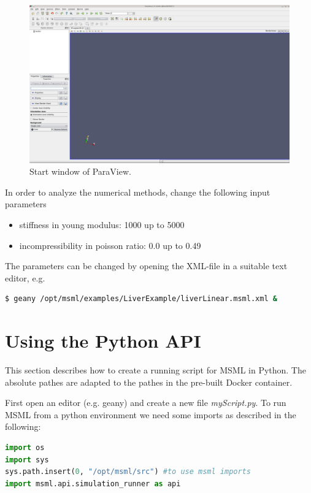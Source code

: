 \begin{figure}[h]
  	\centering
    \includegraphics[width=\textwidth]{pictures/start_paraview.png}
    \caption{Start window of ParaView.}
    \label{ParaViewScreenshot}
\end{figure}

In order to analyze the numerical methods, change the following input parameters
\begin{itemize}
	\item stiffness in young modulus: 1000 up to 5000
	\item incompressibility in poisson ratio: 0.0 up to 0.49
\end{itemize}

The parameters can be changed by opening the XML-file in a suitable text editor, e.g.
\begin{lstlisting}[language=sh, breaklines=true]
$ geany /opt/msml/examples/LiverExample/liverLinear.msml.xml &
\end{lstlisting}


\section{Using the Python API}

This section describes how to create a running script for MSML in Python.
The absolute pathes are adapted to the pathes in the pre-built Docker container.

First open an editor (e.g. geany) and create a new file \emph{myScript.py}.
To run MSML from a python environment we need some imports as described in the following:
\begin{lstlisting}[language=Python]
import os
import sys
sys.path.insert(0, "/opt/msml/src") #to use msml imports
import msml.api.simulation_runner as api
\end{lstlisting}

